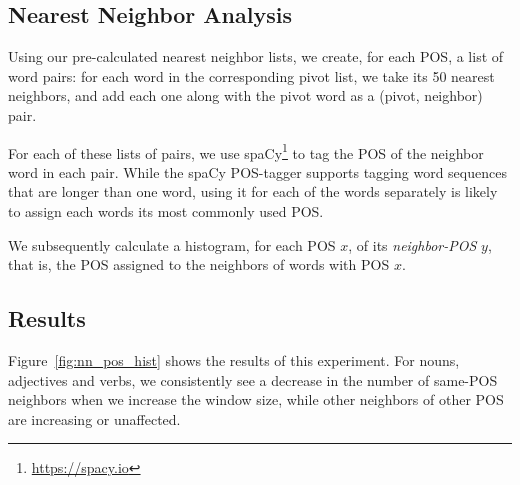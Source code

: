 \documentclass{article}
\begin{document}
    \subsection{Nearest Neighbor Analysis}\label{sec:nn_analysis}
    
    Using our pre-calculated nearest neighbor lists, we create, for each
    POS, a list of word pairs: for each word in the corresponding pivot list,
    we take its 50 nearest neighbors, and add each one along with the pivot word
    as a (pivot, neighbor) pair.
    
    For each of these lists of pairs, we use spaCy\footnote{\url{https://spacy.io}}
    to tag the POS of the neighbor word in each pair.
    While the spaCy POS-tagger supports tagging word sequences that are longer
    than one word, using it for each of the words separately is likely
    to assign each words its most commonly used POS.
    
    We subsequently calculate a histogram, for each POS $x$, of its
    \textit{neighbor-POS} $y$, that is, the POS assigned to the neighbors of
    words with POS $x$.
    
    \subsection{Results}\label{sec:nn_results}
    
    Figure~\ref{fig:nn_pos_hist} shows the results of this experiment.
    For nouns, adjectives and verbs, we consistently see a decrease in
    the number of same-POS neighbors when we increase the window size,
    while other neighbors of other POS are increasing or unaffected.
    
\end{document}
